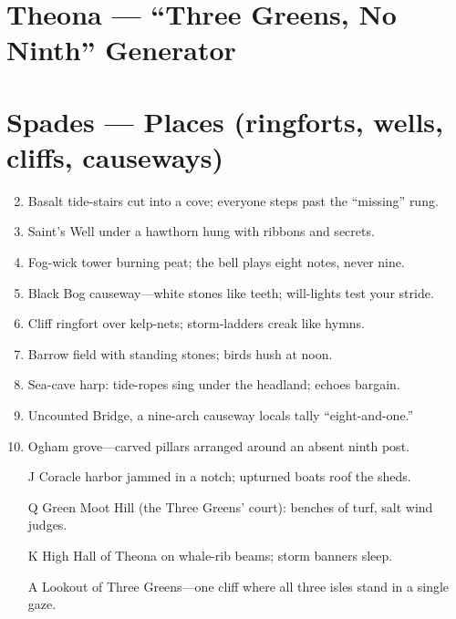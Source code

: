 \section{Theona --- ``Three Greens, No Ninth'' Generator}
\label{chap:theona}

\section*{Spades --- Places (ringforts, wells, cliffs, causeways)}
\label{sec:theona-places}
\begin{enumerate}
\setcounter{enumi}{1}
\item Basalt tide-stairs cut into a cove; everyone steps past the ``missing'' rung.
\item Saint's Well under a hawthorn hung with ribbons and secrets.
\item Fog-wick tower burning peat; the bell plays eight notes, never nine.
\item Black Bog causeway---white stones like teeth; will-lights test your stride.
\item Cliff ringfort over kelp-nets; storm-ladders creak like hymns.
\item Barrow field with standing stones; birds hush at noon.
\item Sea-cave harp: tide-ropes sing under the headland; echoes bargain.
\item Uncounted Bridge, a nine-arch causeway locals tally ``eight-and-one.''
\item Ogham grove---carved pillars arranged around an absent ninth post.
\item[J] Coracle harbor jammed in a notch; upturned boats roof the sheds.
\item[Q] Green Moot Hill (the Three Greens' court): benches of turf, salt wind judges.
\item[K] High Hall of Theona on whale-rib beams; storm banners sleep.
\item[A] Lookout of Three Greens---one cliff where all three isles stand in a single gaze.
\end{enumerate}

